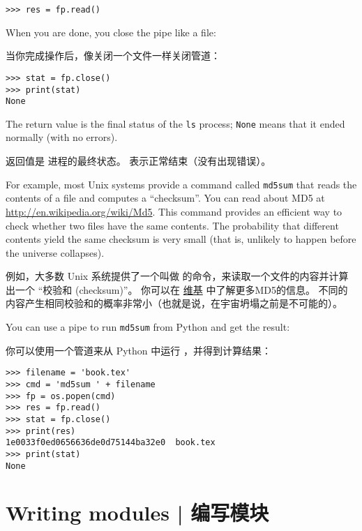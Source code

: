 {{{{{{{\begin{lstlisting}
>>> res = fp.read()
\end{lstlisting}

%
When you are done, you close the pipe like a file:

当你完成操作后，像关闭一个文件一样关闭管道：

  

\begin{lstlisting}
>>> stat = fp.close()
>>> print(stat)
None
\end{lstlisting}

%
The return value is the final status of the {\tt ls} process;
{\tt None} means that it ended normally (with no errors).

返回值是  进程的最终状态。  表示正常结束（没有出现错误）。

For example, most Unix systems provide a command called {\tt md5sum}
that reads the contents of a file and computes a ``checksum''.
You can read about MD5 at \url{http://en.wikipedia.org/wiki/Md5}.  This
command provides an efficient way to check whether two files
have the same contents.  The probability that different contents
yield the same checksum is very small (that is, unlikely to happen
before the universe collapses).

例如，大多数 Unix 系统提供了一个叫做  的命令，来读取一个文件的内容并计算出一个 ``校验和 (checksum)''。
你可以在 \href{http://en.wikipedia.org/wiki/Md5}{维基} 中了解更多MD5的信息。 不同的内容产生相同校验和的概率非常小（也就是说，在宇宙坍塌之前是不可能的）。
  

You can use a pipe to run {\tt md5sum} from Python and get the result:

你可以使用一个管道来从 Python 中运行  ，并得到计算结果：

\begin{lstlisting}
>>> filename = 'book.tex'
>>> cmd = 'md5sum ' + filename
>>> fp = os.popen(cmd)
>>> res = fp.read()
>>> stat = fp.close()
>>> print(res)
1e0033f0ed0656636de0d75144ba32e0  book.tex
>>> print(stat)
None
\end{lstlisting}


\section{Writing modules  |  编写模块}
\label{modules}

}}}}}}}
